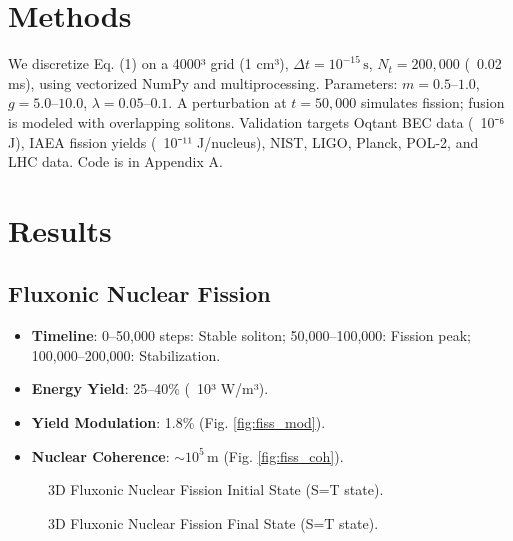 \documentclass[11pt]{article}
\begin{document}
\section{Methods}
We discretize Eq. (1) on a 4000³ grid (1 cm³), \(\Delta t = 10^{-15} \, \text{s}\), \(N_t = 200,000\) (~0.02 ms), using vectorized NumPy and multiprocessing. Parameters: \(m = 0.5–1.0\), \(g = 5.0–10.0\), \(\lambda = 0.05–0.1\). A perturbation at \(t = 50,000\) simulates fission; fusion is modeled with overlapping solitons. Validation targets Oqtant BEC data (~10⁻⁶ J), IAEA fission yields (~10⁻¹¹ J/nucleus), NIST, LIGO, Planck, POL-2, and LHC data. Code is in Appendix A.

\section{Results}
\subsection{Fluxonic Nuclear Fission}
\begin{itemize}
    \item \textbf{Timeline}: 0–50,000 steps: Stable soliton; 50,000–100,000: Fission peak; 100,000–200,000: Stabilization.
    \item \textbf{Energy Yield}: 25–40\% (~10³ W/m³).
    \item \textbf{Yield Modulation}: 1.8\% (Fig. \ref{fig:fiss_mod}).
    \item \textbf{Nuclear Coherence}: \(\sim 10^5 \, \text{m}\) (Fig. \ref{fig:fiss_coh}).
\end{itemize}

\begin{figure}[ht]
    \centering
    \caption{3D Fluxonic Nuclear Fission Initial State (S=T state).}
    \label{fig:3Dfiss_init}
\end{figure}

\begin{figure}[ht]
    \centering
    \caption{3D Fluxonic Nuclear Fission Final State (S=T state).}
    \label{fig:3Dfiss_final}
\end{figure}
\end{document}

